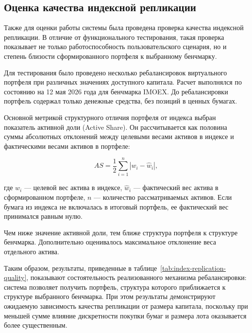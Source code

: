 \documentclass[14pt]{gost-7-32}
\begin{document}
\subsection{Оценка качества индексной репликации}

Также для оценки работы системы была проведена проверка качества индексной репликации. В отличие от функционального тестирования, такая проверка показывает не только работоспособность пользовательского сценария, но и степень близости сформированного портфеля к выбранному бенчмарку.

Для тестирования было проведено несколько ребалансировок виртуального портфеля при различных значениях доступного капитала. Расчет выполнялся по состоянию на 12 мая 2026 года для бенчмарка IMOEX. До ребалансировки портфель содержал только денежные средства, без позиций в ценных бумагах.

Основной метрикой структурного отличия портфеля от индекса выбран показатель активной доли (Active Share). Он рассчитывается как половина суммы абсолютных отклонений между целевыми весами активов в индексе и фактическими весами активов в портфеле:

\[
AS = \frac{1}{2} \sum_{i=1}^{n} |w_i - \hat{w}_i|,
\]

где \(w_i\) --- целевой вес актива в индексе, \(\hat{w}_i\) --- фактический вес актива в сформированном портфеле, \(n\) --- количество рассматриваемых активов. Если бумага из индекса не включалась в итоговый портфель, ее фактический вес принимался равным нулю.

Чем ниже значение активной доли, тем ближе структура портфеля к структуре бенчмарка. Дополнительно оценивалось максимальное отклонение веса отдельного актива.

Таким образом, результаты, приведенные в таблице~\ref{tab:index-replication-quality}, показывают состоятельность реализованного механизма ребалансировки: система позволяет получить портфель, структура которого приближается к структуре выбранного бенчмарка. При этом результаты демонстрируют ожидаемую зависимость качества репликации от размера капитала, поскольку при меньшей сумме влияние дискретности покупки бумаг и размера лота оказывается более существенным.
\end{document}
